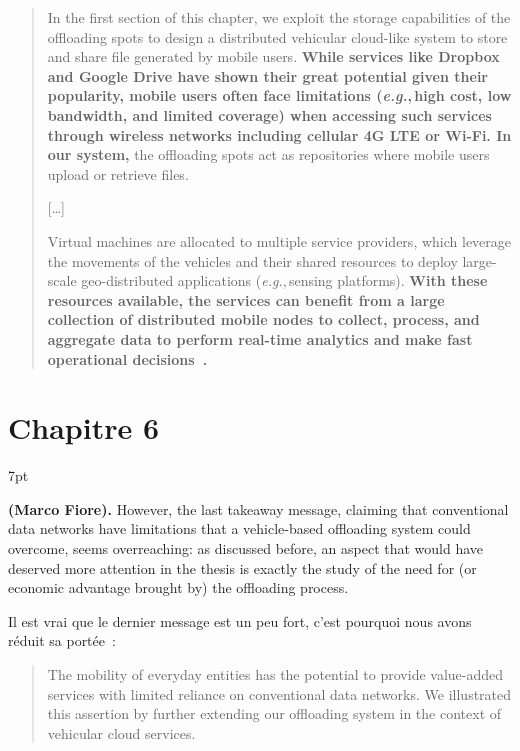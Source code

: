 \documentclass[11pt]{article}
\newcommand{\eg}{\textit{e.g.},\,}
\newenvironment{formal}{%
  \vspace*{-5pt}
  \def\FrameCommand{%
    \hspace{-5pt}%
    {\color{gray50}\vrule width 1.25pt}%
    \colorbox{formalcolor}%
  }%
  \MakeFramed{\advance\hsize-\width\FrameRestore}%
  \noindent\hspace{-4.55pt}%
  \begin{adjustwidth}{}{7pt}%
  \normalsize
  \vspace{-2pt}
}
{%
  \vspace{2pt}\end{adjustwidth}\endMakeFramed%
  \vspace*{-10pt}
}
\begin{document}
\begin{quote}
In the first section of this chapter, we exploit the storage capabilities of the offloading spots to design a distributed vehicular cloud-like system to store and share file generated by mobile users. \textbf{While services like Dropbox and Google Drive have shown their great potential given their popularity, mobile users often face limitations (\eg high cost, low bandwidth, and limited coverage) when accessing such services through wireless networks including cellular 4G LTE or Wi-Fi. In our system,} the offloading spots act as repositories where mobile users upload or retrieve files. 

\begin{center}
[\dots]
\end{center}

Virtual machines are allocated to multiple service providers, which leverage the movements of the vehicles and their shared resources to deploy large-scale geo-distributed applications (\eg sensing platforms). \textbf{With these resources available, the services can benefit from a large collection of distributed mobile nodes to collect, process, and aggregate data to perform real-time analytics and make fast operational decisions~\cite{bonomi2012fog}.}
\end{quote}


\section{Chapitre 6}

\begin{formal}
\textbf{(Marco Fiore).} However, the last takeaway message, claiming that conventional data networks have limitations that a vehicle-based offloading system could overcome, seems overreaching: as discussed before, an aspect that would have deserved more attention in the thesis is exactly the study of the need for (or economic advantage brought by) the offloading process.
\end{formal}

Il est vrai que le dernier message est un peu fort, c'est pourquoi nous avons réduit sa portée~:
\begin{quote}
The mobility of everyday entities has the potential to provide value-added services with limited reliance on conventional data networks. We illustrated this assertion by further extending our offloading system in the context of vehicular cloud services.
\end{quote}
\end{document}
